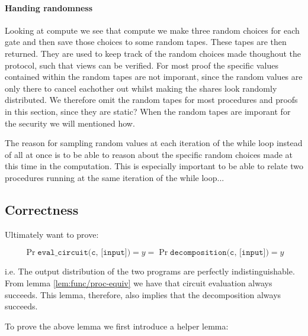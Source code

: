 \paragraph{Handing randomness}
\label{subsec:decomp:randomness}
Looking at compute we see that compute we make three random choices for each gate and then save those choices to some random tapes. These tapes are then returned. They are used to keep track of the random choices made thoughout the protocol, such that views can be verified. For most proof the specific values contained within the random tapes are not imporant, since the random values are only there to cancel eachother out whilst making the shares look randomly distributed.
We therefore omit the random tapes for most procedures and proofs in this section, since they are static?
When the random tapes are imporant for the security we will mentioned how.

The reason for sampling random values at each iteration of the while loop instead of all at once is to be able to reason about the specific random choices made at this time in the computation. This is especially important to be able to relate two procedures running at the same iteration of the while loop...


\subsection{Correctness}
\label{sec:decomp_correct}
Ultimately want to prove:
\begin{lemma}
  \label{lem:decomposition_correctness}

  \[
    \Pr{\texttt{eval\_circuit(c, [input])} = y} =
    \Pr{\texttt{decomposition(c, [input])} = y}
  \]

  i.e. The output distribution of the two programs are perfectly indistinguishable. From lemma \ref{lem:func/proc-equiv} we have that circuit evaluation always succeeds. This lemma, therefore, also implies that the decomposition always succeeds.
\end{lemma}

To prove the above lemma we first introduce a helper lemma:

